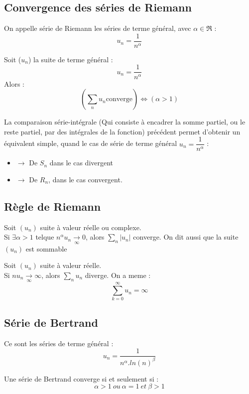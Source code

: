 \subsection{Convergence des séries de Riemann}
\begin{de}
On appelle série de Riemann les séries de terme général, avec $\alpha \in \Re$ :
$$u_n = \dfrac{1}{n^{\alpha}}$$
\end{de}
\begin{prop}
Soit ($u_n$) la suite de terme général :
$$u_n = \dfrac{1}{n^{\alpha}}$$
Alors :
$$(\underset{n}\sum u_n \mbox{converge}) \Leftrightarrow (\alpha > 1)$$
\end{prop}
\begin{prop}
La comparaison série-intégrale (Qui consiste à encadrer la somme partiel, ou le reste partiel, par des intégrales de la fonction) précédent permet d'obtenir un équivalent simple, quand le cas de série de terme général $u_n = \dfrac{1}{n^{\alpha}}$ :
\begin{itemize}
 \item{$\rightarrow$} De $S_n$ dans le cas divergent
 \item{$\rightarrow$} De $R_n$, dans le cas convergent.
\end{itemize}
\end{prop}

\subsection{Règle de Riemann}
\begin{prop}
Soit $(u_n)$ suite à valeur réelle ou complexe.\\
Si $\exists \alpha > 1$ telque $n^{\alpha}u_n \underset{\infty}\rightarrow 0$, alors $\underset{n}\sum |u_n|$ converge. On dit aussi que la suite $(u_n)$ est sommable
\end{prop}
\begin{prop}
Soit $(u_n)$ suite à valeur réelle.\\
Si $nu_n \underset{\infty}\rightarrow \infty$, alors $\underset{n}\sum u_n$ diverge. On a meme : 
$$\sum_{k=0}^{\infty} u_n = \infty$$
\end{prop}
\subsection{Série de Bertrand}
\begin{de}
Ce sont les séries de terme général :
$$u_n = \dfrac{1}{n^{\alpha}.ln(n)^{\beta}}$$
\end{de}
\begin{prop}
Une série de Bertrand converge si et seulement si : 
$$\alpha > 1~ ou~ \alpha=1~ et~ \beta>1$$
\end{prop}
